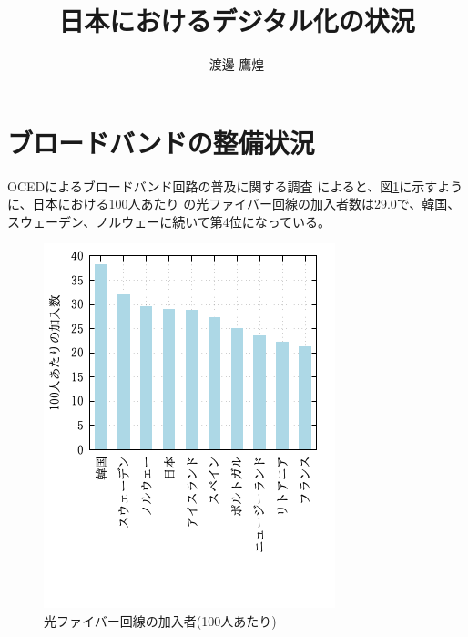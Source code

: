 \documentclass[a4paper,11pt,dvipdfmx]{ujarticle}
\title{日本におけるデジタル化の状況}
\author{渡邊 鷹煌}
\begin{document}
\maketitle %

\section{ブロードバンドの整備状況}

OCEDによるブロードバンド回路の普及に関する調査\cite{oecd}
によると、図\ref{1}に示すように、日本における100人あたり
の光ファイバー回線の加入者数は29.0で、韓国、
スウェーデン、ノルウェーに続いて第4位になっている。

\begin{figure}[htbp]
    \centering
    \includegraphics{fig11.png}
    \caption{光ファイバー回線の加入者(100人あたり)}\label{1}
\end{figure}
\end{document}
